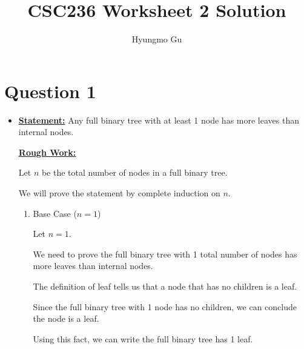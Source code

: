 \documentclass[12pt]{article}
\begin{document}
\title{CSC236 Worksheet 2 Solution}
\author{Hyungmo Gu}
\maketitle

\section*{Question 1}
\begin{itemize}
    \item

    \bigskip

    \underline{\textbf{Statement:}} Any full binary tree with at least 1 node has
    more leaves than internal nodes.

    \bigskip

    \begin{mdframed}
        \underline{\textbf{Rough Work:}}

        \bigskip

        Let $n$ be the total number of nodes in a full binary tree.

        \bigskip

        We will prove the statement by complete induction on $n$.

        \bigskip

        \begin{enumerate}[1.]
            \item Base Case ($n = 1$)

            \begin{mdframed}

            Let $n = 1$.

            \bigskip

            We need to prove the full binary tree with 1 total number of nodes
            has more leaves than internal nodes.

            \bigskip

            The definition of leaf tells us that a node that has no children
            is a leaf.

            \bigskip

            Since the full binary tree with 1 node has no children, we
            can conclude the node is a leaf.

            \bigskip

            Using this fact, we can write the full binary tree has 1 leaf.

            \bigskip


\end{mdframed}
\end{enumerate}
\end{mdframed}
\end{itemize}
\end{document}
